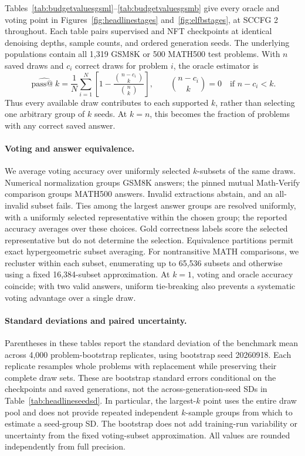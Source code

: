 Tables~\ref{tab:budgetvaluesgsml}--\ref{tab:budgetvaluesgsmb} give every oracle and voting point in Figures~\ref{fig:headlinestages} and~\ref{fig:elfbstages}, at SCCFG 2 throughout. Each table pairs supervised and NFT checkpoints at identical denoising depths, sample counts, and ordered generation seeds. The underlying populations contain all 1,319 GSM8K or 500 MATH500 test problems. With $n$ saved draws and $c_i$ correct draws for problem $i$, the oracle estimator is
\begin{equation}
 \widehat{\operatorname{pass@}k}
 =\frac{1}{N}\sum_{i=1}^{N}
 \left[1-\frac{\binom{n-c_i}{k}}{\binom{n}{k}}\right],
 \qquad \binom{n-c_i}{k}=0\quad\text{if }n-c_i<k.
\end{equation}
Thus every available draw contributes to each supported $k$, rather than selecting one arbitrary group of $k$ seeds. At $k=n$, this becomes the fraction of problems with any correct saved answer.

\paragraph{Voting and answer equivalence.}
We average voting accuracy over uniformly selected $k$-subsets of the same draws. Numerical normalization groups GSM8K answers; the pinned mutual Math-Verify comparison groups MATH500 answers. Invalid extractions abstain, and an all-invalid subset fails. Ties among the largest answer groups are resolved uniformly, with a uniformly selected representative within the chosen group; the reported accuracy averages over these choices. Gold correctness labels score the selected representative but do not determine the selection. Equivalence partitions permit exact hypergeometric subset averaging. For nontransitive MATH comparisons, we recluster within each subset, enumerating up to 65,536 subsets and otherwise using a fixed 16,384-subset approximation. At $k=1$, voting and oracle accuracy coincide; with two valid answers, uniform tie-breaking also prevents a systematic voting advantage over a single draw.

\paragraph{Standard deviations and paired uncertainty.}
Parentheses in these tables report the standard deviation of the benchmark mean across 4,000 problem-bootstrap replicates, using bootstrap seed 20260918. Each replicate resamples whole problems with replacement while preserving their complete draw sets. These are bootstrap standard errors conditional on the checkpoints and saved generations, not the across-generation-seed SDs in Table~\ref{tab:headlineseedsd}. In particular, the largest-$k$ point uses the entire draw pool and does not provide repeated independent $k$-sample groups from which to estimate a seed-group SD. The bootstrap does not add training-run variability or uncertainty from the fixed voting-subset approximation. All values are rounded independently from full precision.

